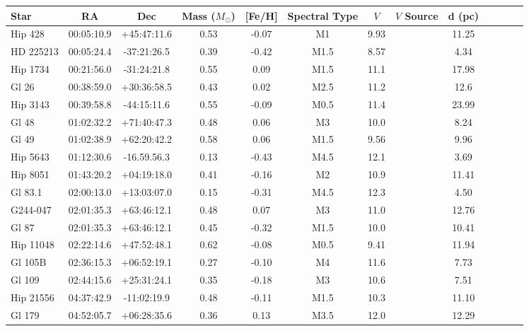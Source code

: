 \begin{landscape}
{\footnotesize
\begin{longtable}{l|cccccccccccc} 
\hline
Star & RA & Dec & Mass ($M_\odot$) & [Fe/H] & Spectral Type & $V$ & $V$ Source & d (pc) \\
\hline
    Hip 428 & 00:05:10.9 & +45:47:11.6 & 0.53 & -0.07 & M1 &  9.93 & \citet{Gliese91} & 11.25  \\ 
    HD 225213 & 00:05:24.4 & -37:21:26.5 & 0.39 & -0.42 & M1.5 &  8.57 & \citet{Koen10} &  4.34  \\ 
   Hip 1734 & 00:21:56.0 & -31:24:21.8 & 0.55 & 0.09 & M1.5 &  11.1 & \citet{Koen10} & 17.98    \\ 
      Gl 26 & 00:38:59.0 & +30:36:58.5 & 0.43 & 0.02 & M2.5 & 11.2 & \citet{Hog00} &  12.6  \\ 
   Hip 3143 & 00:39:58.8 & -44:15:11.6 & 0.55 & -0.09 & M0.5 &  11.4 & \citet{Koen10} & 23.99 \\ 
      Gl 48 & 01:02:32.2 & +71:40:47.3 & 0.48 & 0.06 & M3 & 10.0 & \citet{Hog00} &  8.24   \\ 
      Gl 49 & 01:02:38.9 & +62:20:42.2 & 0.58 & 0.06 & M1.5 & 9.56 & \citet{Hog00} & 9.96    \\ 
   Hip 5643 & 01:12:30.6 & -16.59.56.3 & 0.13 & -0.43 & M4.5 & 12.1 & \citet{Koen10} & 3.69  \\
   Hip 8051 & 01:43:20.2 & +04:19:18.0 & 0.41 & -0.16 & M2 &  10.9 & \citet{Koen10} & 11.41  \\ 
   Gl 83.1 & 02:00:13.0 & +13:03:07.0 & 0.15 & -0.31 & M4.5 & 12.3 & \citet{Landolt92} & 4.50    \\
  G244-047 & 02:01:35.3 & +63:46:12.1 & 0.48 & 0.07 & M3 & 11.0 & \citet{Hog00} & 12.76    \\ 
      Gl 87 & 02:01:35.3 & +63:46:12.1 & 0.45 & -0.32 & M1.5 & 10.0 & \citet{Koen10} & 10.41 \\ 
  Hip 11048 & 02:22:14.6 & +47:52:48.1 & 0.62 & -0.08 & M0.5 & 9.41 & \citet{Gliese91} & 11.94   \\ 
    Gl 105B & 02:36:15.3 & +06:52:19.1 & 0.27 & -0.10 & M4 & 11.6 & \citet{Jenkins09} & 7.73 \\ 
     Gl 109 & 02:44:15.6 & +25:31:24.1 & 0.35 & -0.18 & M3 & 10.6 & \citet{Koen10} &  7.51    \\ 
  Hip 21556 & 04:37:42.9 & -11:02:19.9 & 0.48 & -0.11 & M1.5 &  10.3 & \citet{Koen10} & 11.10    \\ 
  Gl 179 & 04:52:05.7 & +06:28:35.6 & 0.36 & 0.13 & M3.5 &  12.0 & \citet{Koen10} & 12.29  \\

\end{longtable}}
\end{landscape}
